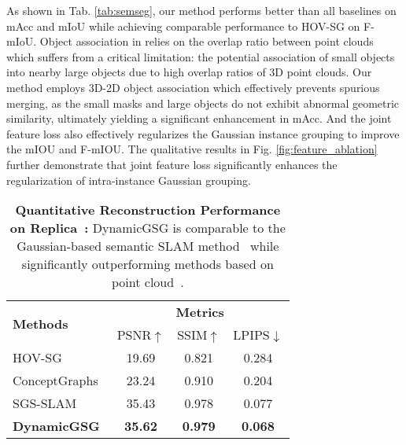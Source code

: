 As shown in Tab. \ref{tab:semseg}, our method performs better than all baselines on mAcc and mIoU while achieving comparable performance to HOV-SG on F-mIoU. Object association in \cite{gu2023conceptgraphsopenvocabulary3dscene, werby23hovsg} relies on the overlap ratio between point clouds which suffers from a critical limitation: the potential association of small objects into nearby large objects due to high overlap ratios of 3D point clouds. Our method employs 3D-2D object association which effectively prevents spurious merging, as the small masks and large objects do not exhibit abnormal geometric similarity, ultimately yielding a significant enhancement in mAcc. And the joint feature loss also effectively regularizes the Gaussian instance grouping to improve the mIOU and F-mIOU. The qualitative results in Fig. \ref{fig:feature_ablation} further demonstrate that joint feature loss significantly enhances the regularization of intra-instance Gaussian grouping.

\renewcommand{\arraystretch}{1.2}
\begin{table}[!t]
    \centering
    \begin{tabular}{lccc}\toprule
\multirow{2}{*}{\textbf{Methods}}      & \multicolumn{3}{c}{\textbf{Metrics}}  \\
& PSNR$\uparrow$        & SSIM$\uparrow$   & LPIPS$\downarrow$  \\ \midrule 

HOV-SG~\cite{werby23hovsg}      & 19.69          & 0.821     & 0.284  \\

ConceptGraphs~\cite{gu2023conceptgraphsopenvocabulary3dscene} & 23.24                & 0.910             & 0.204      \\

SGS-SLAM~\cite{Li_2024}  & 35.43            & 0.978      & 0.077       \\

\textbf{DynamicGSG}   & \textbf{35.62}       & \textbf{0.979}              & \textbf{0.068}              \\
 \bottomrule
\end{tabular}
    \caption{\textbf{Quantitative Reconstruction Performance on Replica~\cite{replica19arxiv}:} DynamicGSG is comparable to the Gaussian-based semantic SLAM method~\cite{Li_2024} while significantly outperforming methods based on point cloud~\cite{gu2023conceptgraphsopenvocabulary3dscene,werby23hovsg}.}
    \label{tab:replica}
\end{table}



